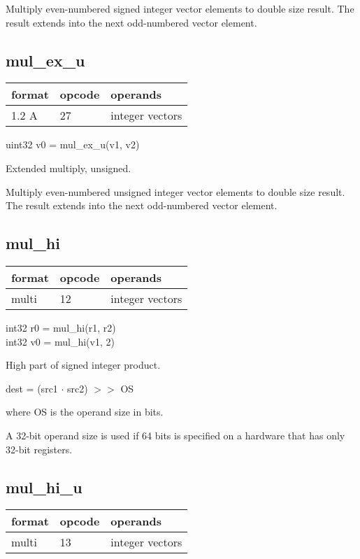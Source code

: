 \documentclass[forwardcom.tex]{subfiles}
\begin{document}
Multiply even-numbered signed integer vector elements to double size result. The result extends into the next odd-numbered vector element.
\vv


\subsection{mul\_ex\_u}
\label{table:mulExUInstruction}
\begin{tabular}{|p{12mm}|p{15mm}|p{100mm}|}
\hline
\bfseries format & \bfseries opcode & \bfseries operands \\ \hline
1.2 A & 27 & integer vectors \\ \hline
\end{tabular}
\vv

uint32 v0 = mul\_ex\_u(v1, v2)
\vv

Extended multiply, unsigned.
\vv

Multiply even-numbered unsigned integer vector elements to double size result. The result extends into the next odd-numbered vector element.
\vv


\subsection{mul\_hi}
\label{table:mulHiInstruction}
\begin{tabular}{|p{12mm}|p{15mm}|p{100mm}|}
\hline
\bfseries format & \bfseries opcode & \bfseries operands \\ \hline
multi & 12 & integer vectors \\ \hline
\end{tabular}
\vv

int32 r0 = mul\_hi(r1, r2) \\
int32 v0 = mul\_hi(v1, 2)
\vv

High part of signed integer product.
\vv

dest = (src1 $\cdot$ src2) $>>$ OS

where OS is the operand size in bits.
\vv

A 32-bit operand size is used if 64 bits is specified on a hardware that has only 32-bit registers.
\vv


\subsection{mul\_hi\_u}
\label{table:mulHiUInstruction}
\begin{tabular}{|p{12mm}|p{15mm}|p{100mm}|}
\hline
\bfseries format & \bfseries opcode & \bfseries operands \\ \hline
multi & 13 & integer vectors \\ \hline
\end{tabular}
\vv
\end{document}
